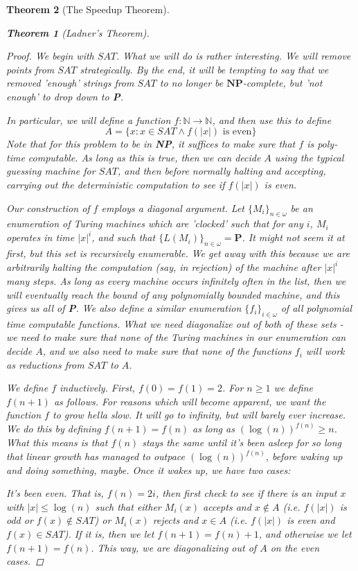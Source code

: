 \documentclass{article}
\theoremstyle{definition}
\theoremstyle{plain}
\theoremstyle{theorem}
\newtheorem{theorem}{Theorem}[section]
\begin{document}
\begin{theorem}[The Speedup Theorem]
\begin{theorem}[Ladner's Theorem]
\end{theorem}
\begin{proof}
	We begin with $SAT$. What we will do is rather interesting. We will remove points from $SAT$ strategically. By the end, it will be tempting to say that we removed 'enough' strings from $SAT$ to no longer be $\textbf{NP}$-complete, but 'not enough' to drop down to \textbf{P}.
	\par In particular, we will define a function $f:\mathbb{N} \to \mathbb{N}$, and then use this to define 
	\[ A = \{x: x \in SAT \wedge f(|x|) \textrm{ is even}\}  \] 
	Note that for this problem to be in \textbf{NP}, it suffices to make sure that $f$ is poly-time computable. As long as this is true, then we can decide $A$ using the typical guessing machine for $SAT$, and then before normally halting and accepting, carrying out the deterministic computation to see if $f(|x|)$ is even.
	\par Our construction of $f$ employs a diagonal argument. Let $\{M_i\}_{n \in \omega}$ be an enumeration of Turing machines which are 'clocked' such that for any $i$, $M_i$ operates in time $|x|^i$, and such that $\{L(M_i)\}_{n \in \omega} = \textbf{P}$. It might not seem it at first, but this set is recursively enumerable. We get away with this because we are arbitrarily halting the computation (say, in rejection) of the machine after $|x|^i$ many steps. As long as every machine occurs infinitely often in the list, then we will eventually reach the bound of any polynomially bounded machine, and this gives us all of \textbf{P}. We also define a similar enumeration $\{f_i\}_{i \in \omega}$ of all polynomial time computable functions. What we need diagonalize out of both of these sets - we need to make sure that none of the Turing machines in our enumeration can decide $A$, and we also need to make sure that none of the functions $f_i$ will work as reductions from $SAT$ to $A$.
	\par We define $f$ inductively. First, $f(0) = f(1) = 2$. For $n \geq 1$ we define $f(n+1)$ as follows. For reasons which will become apparent, we want the function $f$ to grow \textit{hella slow}. It will go to infinity, but will barely \textit{ever} increase. We do this by defining $f(n+1) = f(n)$ as long as $(\log(n))^{f(n)} \geq n$. What this means is that $f(n)$ stays the same until it's been asleep for so long that linear growth has managed to outpace $(\log(n))^{f(n)}$, before waking up and doing something, \textit{maybe}. Once it wakes up, we have two cases:
	\par It's been even. That is, $f(n) = 2i$, then first check to see if there is an input $x$ with $|x| \leq \log(n)$ such that either $M_i(x)$ accepts and $x \notin A$ (i.e. $f(|x|)$ is odd or $f(x) \notin SAT$) or $M_i(x)$ rejects and $x \in A$ (i.e. $f(|x|)$ is even and $f(x) \in SAT$). If it is, then we let $f(n+1) = f(n)+1$, and otherwise we let $f(n+1) = f(n)$. This way, we are diagonalizing out of $A$ on the even cases.

\end{proof}
\end{theorem}
\end{document}
